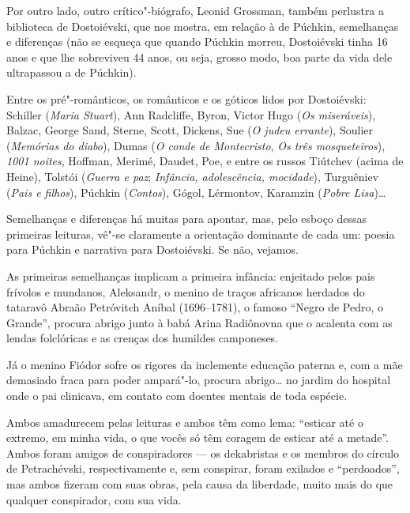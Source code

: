 Por outro lado, outro crítico"-biógrafo, Leonid Grossman, também
perlustra a biblioteca de Dostoiévski, que nos mostra, em relação à de
Púchkin, semelhanças e diferenças (não se esqueça que quando Púchkin
morreu, Dostoiévski tinha 16 anos e que lhe sobreviveu 44 anos, ou
seja, grosso modo, boa parte da vida dele ultrapassou a de Púchkin).

Entre os pré"-românticos, os românticos e os góticos lidos por
Dostoiévski: Schiller (\emph{Maria Stuart}), Ann Radcliffe, Byron,
Victor Hugo (\emph{Os miseráveis}), Balzac, George Sand, Sterne, Scott, Dickens, Sue (\emph{O judeu errante}), Soulier (\emph{Memórias
do diabo}), Dumas (\emph{O conde de Montecristo}, \emph{Os três
mosqueteiros}), \emph{1001 noites}, Hoffman, Merimé, Daudet, Poe, e
entre os russos Tiútchev (acima de Heine), Tolstói (\emph{Guerra e paz}; \emph{Infância, adolescência, mocidade}), Turguêniev (\emph{Pais e
filhos}), Púchkin (\emph{Contos}), Gógol, Lérmontov, Karamzin
(\emph{Pobre Lisa})\ldots{}

Semelhanças e diferenças há muitas para apontar, mas, pelo esboço dessas
primeiras leituras, vê"-se claramente a orientação dominante de cada um:
poesia para Púchkin e narrativa para Dostoiévski. Se não, vejamos.

As primeiras semelhanças implicam a primeira infância: enjeitado pelos
pais frívolos e mundanos, Aleksandr, o menino de traços africanos
herdados do tataravô Abraão Petróvitch Aníbal (1696--1781), o famoso
``Negro de Pedro, o Grande'', procura abrigo junto à babá Arina
Radiônovna que o acalenta com as lendas folclóricas e as crenças dos
humildes camponeses.

Já o menino Fiódor sofre os rigores da inclemente educação paterna e, com a
mãe demasiado fraca para poder ampará"-lo, procura abrigo\ldots{} no jardim do
hospital onde o pai clinicava, em contato com doentes mentais de toda espécie.

Ambos amadurecem pelas leituras e ambos têm como lema: ``esticar até o
extremo, em minha vida, o que vocês só têm coragem de esticar até a
metade''. Ambos foram amigos de conspiradores --- os dekabristas e os
membros do círculo de Petrachévski, respectivamente e, sem conspirar,
foram exilados e ``perdoados'', mas ambos fizeram com suas obras, pela
causa da liberdade, muito mais do que qualquer conspirador, com sua
vida.

